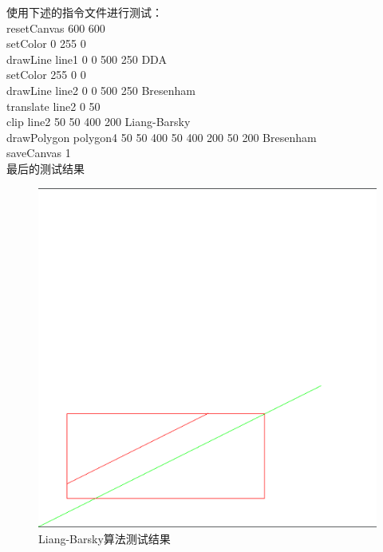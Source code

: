\documentclass[a4paper,UTF8]{article}
\theoremstyle{definition}
\begin{document}
使用下述的指令文件进行测试：\\

resetCanvas 600 600\\

setColor 0 255 0\\

drawLine line1 0 0 500 250 DDA\\

setColor 255 0 0\\

drawLine line2 0 0 500 250 Bresenham\\

translate line2 0 50\\

clip line2 50 50 400 200 Liang-Barsky\\

drawPolygon polygon4 50 50 400 50 400 200 50 200 Bresenham\\

saveCanvas 1\\

最后的测试结果

\begin{figure}[h]
	\centering
	\includegraphics[scale=0.4]{figure/clip1.png}
	\caption{Liang-Barsky算法测试结果}
	\label{fig:Liang-Barsky算法剪切}
\end{figure}
\end{document}
